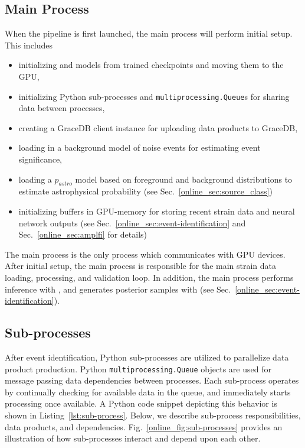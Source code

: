 \begin{refsection}
\subsection{Main Process} \label{online_sec:main-process}
When the pipeline is first launched, the main process will perform initial setup. 
This includes 

\begin{itemize}
    \item initializing \aframe and \amplfi models from trained checkpoints and moving them to the GPU,
    \item initializing Python sub-processes and \texttt{multiprocessing.Queue}s for sharing data between processes,
    \item creating a GraceDB client instance for uploading data products to GraceDB,
    \item loading in a background model of noise events for estimating event significance,
    \item loading a $p_{astro}$ model based on foreground and background distributions to estimate astrophysical probability (see Sec.~\ref{online_sec:source_class})
    \item initializing buffers in GPU-memory for storing recent strain data and neural network outputs (see Sec.~\ref{online_sec:event-identification} and Sec.~\ref{online_sec:amplfi} for details)
\end{itemize}

The main process is the only process which communicates with GPU devices. 
After initial setup, the main process is responsible for the main strain data loading, processing, and validation loop. 
In addition, the main process performs inference with \aframe, and generates posterior samples with \amplfi (see Sec.~\ref{online_sec:event-identification}). 

\subsection{Sub-processes} \label{online_sec:sub-process}
After event identification, Python sub-processes are utilized to parallelize data product production. 
Python \texttt{multiprocessing.Queue} objects are used for message passing data dependencies between processes. 
Each sub-process operates by continually checking for available data in the queue, and immediately starts processing once available. 
A Python code snippet depicting this behavior is shown in Listing~\ref{lst:sub-process}. 
Below, we describe sub-process responsibilities, data products, and dependencies. 
Fig.~\ref{online_fig:sub-processes} provides an illustration of how sub-processes interact and depend upon each other. 


\end{refsection}
